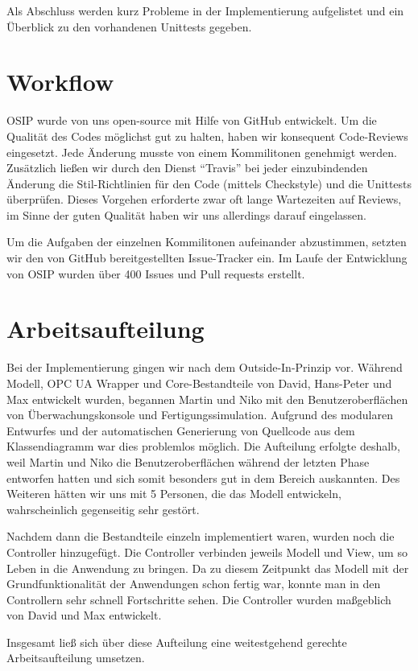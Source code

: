 \documentclass[parskip=full]{scrartcl}
\begin{document}
Als Abschluss werden kurz Probleme in der Implementierung aufgelistet und ein Überblick zu den vorhandenen Unittests gegeben.

\section{Workflow}
OSIP wurde von uns open-source mit Hilfe von GitHub entwickelt. Um die Qualität des Codes möglichst gut zu halten,
haben wir konsequent Code-Reviews eingesetzt. Jede Änderung musste von einem Kommilitonen genehmigt werden. Zusätzlich ließen wir
durch den Dienst "`Travis"' bei jeder einzubindenden Änderung die Stil-Richtlinien für den Code (mittels Checkstyle) und die Unittests überprüfen.
Dieses Vorgehen erforderte zwar oft lange Wartezeiten auf Reviews, im Sinne der guten Qualität haben wir uns allerdings darauf eingelassen. 

Um die Aufgaben der einzelnen Kommilitonen aufeinander abzustimmen, setzten wir den von GitHub bereitgestellten Issue-Tracker ein. Im Laufe der
Entwicklung von OSIP wurden über 400 Issues und Pull requests erstellt.

\section{Arbeitsaufteilung}
Bei der Implementierung gingen wir nach dem Outside-In-Prinzip vor. Während Modell, OPC UA Wrapper und Core-Bestandteile von David, Hans-Peter und Max entwickelt wurden,
begannen Martin und Niko mit den Benutzeroberflächen von Überwachungskonsole und Fertigungssimulation. Aufgrund des modularen Entwurfes
und der automatischen Generierung von Quellcode aus dem Klassendiagramm war dies problemlos möglich. Die Aufteilung erfolgte deshalb, weil Martin und Niko die
Benutzeroberflächen während der letzten Phase entworfen hatten und sich somit besonders gut in dem Bereich auskannten. Des Weiteren hätten wir uns mit 5 Personen,
die das Modell entwickeln, wahrscheinlich gegenseitig sehr gestört.

Nachdem dann die Bestandteile einzeln implementiert waren, wurden noch die Controller hinzugefügt. Die Controller verbinden jeweils Modell und View,
um so Leben in die Anwendung zu bringen. Da zu diesem Zeitpunkt das Modell mit der Grundfunktionalität der Anwendungen schon fertig war,
konnte man in den Controllern sehr schnell Fortschritte sehen. Die Controller wurden maßgeblich von David und Max entwickelt.

Insgesamt ließ sich über diese Aufteilung eine weitestgehend gerechte Arbeitsaufteilung umsetzen.
\end{document}
